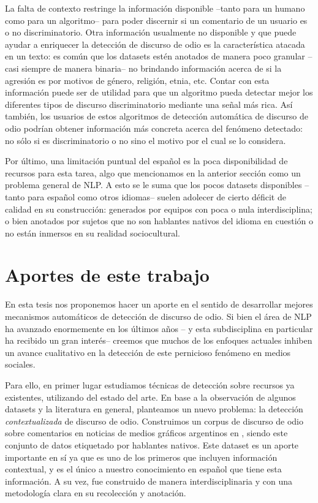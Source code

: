 La falta de contexto restringe la información disponible --tanto para un humano como para un algoritmo-- para poder discernir si un comentario de un usuario es o no discriminatorio. Otra información usualmente no disponible y que puede ayudar a enriquecer la detección de discurso de odio es la característica atacada en un texto: es común que los datasets estén anotados de manera poco granular --casi siempre de manera binaria-- no brindando información acerca de si la agresión es por motivos de género, religión, etnia, etc. Contar con esta información puede ser de utilidad para que un algoritmo pueda detectar mejor los diferentes tipos de discurso discriminatorio mediante una señal más rica. Así también, los usuarios de estos algoritmos de detección automática de discurso de odio podrían obtener información más concreta acerca del fenómeno detectado: no sólo si es discriminatorio o no sino el motivo por el cual se lo considera.

Por último, una limitación puntual del español es la poca disponibilidad de recursos para esta tarea, algo que mencionamos en la anterior sección como un problema general de NLP. A esto se le suma que los pocos datasets disponibles --tanto para español como otros idiomas-- suelen adolecer de cierto déficit de calidad en su construcción: generados por equipos con poca o nula interdisciplina; o bien anotados por sujetos que no son hablantes nativos del idioma en cuestión o no están inmersos en su realidad sociocultural.

\section{Aportes de este trabajo}

En esta tesis nos proponemos hacer un aporte en el sentido de desarrollar mejores mecanismos automáticos de detección de discurso de odio. Si bien el área de NLP ha avanzado enormemente en los últimos años -- y esta subdisciplina en particular ha recibido un gran interés-- creemos que muchos de los enfoques actuales inhiben un avance cualitativo en la detección de este pernicioso fenómeno en medios sociales.

Para ello, en primer lugar estudiamos técnicas de detección sobre recursos ya existentes, utilizando del estado del arte. En base a la observación de algunos datasets y la literatura en general, planteamos un nuevo problema: la detección \emph{contextualizada} de discurso de odio. Construimos un corpus de discurso de odio sobre comentarios en noticias de medios gráficos argentinos en \twitter{}, siendo este conjunto de datos etiquetado por hablantes nativos. Este dataset es un aporte importante en sí ya que es uno de los primeros que incluyen información contextual, y es el único a nuestro conocimiento en español que tiene esta información. A su vez, fue construido de manera interdisciplinaria y con una metodología clara en su recolección y anotación.

